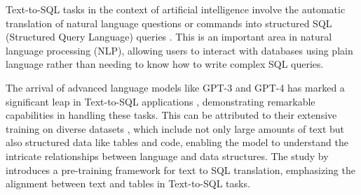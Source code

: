         Text-to-SQL tasks in the context of artificial intelligence involve the automatic translation of natural language questions or commands into structured SQL (Structured Query Language) queries \citep{Qin2022}. This is an important area in natural language processing (NLP), allowing users to interact with databases using plain language rather than needing to know how to write complex SQL queries.         
        
        The arrival of advanced language models like GPT-3 and GPT-4 \citep{OpenAImodels} has marked a significant leap in Text-to-SQL applications \citep{Singh2023}, demonstrating remarkable capabilities in handling these tasks. This can be attributed to their extensive training on diverse datasets \citep{Deng2021}, which include not only large amounts of text but also structured data like tables and code, enabling the model to understand the intricate relationships between language and data structures. The study by \citep{Deng2023} introduces a pre-training framework for text to SQL translation, emphasizing the alignment between text and tables in Text-to-SQL tasks.
    



